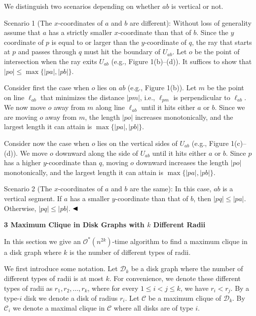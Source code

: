 \documentclass[10pt,a4paper]{amsart}
\begin{document}
We distinguish two scenarios depending on whether $ab$ is vertical or not.
\par
\par
Scenario 1 (The $x$-coordinates of $a$ and $b$ are different): Without loss of generality assume that $a$ has a strictly smaller $x$-coordinate than that of $b$. Since the $y$ coordinate of $p$ is equal to or larger than the $y$-coordinate of $q$, the ray that starts at $p$ and passes through $q$ must hit the boundary of $U_{ab}$. Let $o$ be the point of intersection when the ray exits $U_{ab}$ (e.g., Figure 1(b)–(d)). It suffices to show that $|po|\leq\max\{|pa|,|pb|\}$.
\par
\par
Consider first the case when $o$ lies on $ab$ (e.g., Figure 1(b)). Let $m$ be the point on line $\ell_{ab}$ that minimizes the distance $|pm|$, i.e., $\ell_{pm}$ is perpendicular to $\ell_{ab}$. We now move $o$ away from $m$ along line $\ell_{ab}$ until it hits either $a$ or $b$. Since we are moving $o$ away from $m$, the length $|po|$ increases monotonically, and the largest length it can attain is $\max\{|pa|,|pb|\}$.
\par
\par
Consider now the case when $o$ lies on the vertical sides of $U_{ab}$ (e.g., Figure 1(c)–(d)). We move $o$ downward along the side of $U_{ab}$ until it hits either $a$ or $b$. Since $p$ has a higher $y$-coordinate than $q$, moving $o$ downward increases the length $|po|$ monotonically, and the largest length it can attain is $\max\{|pa|,|pb|\}$.
\par
\par
Scenario 2 (The $x$-coordinates of $a$ and $b$ are the same): In this case, $ab$ is a vertical segment. If $a$ has a smaller $y$-coordinate than that of $b$, then $|pq|\leq|pa|$. Otherwise, $|pq|\leq|pb|$. $\hfill\blacktriangleleft$
\par
\par
\par
\par\medskip\noindent\textbf{3 Maximum Clique in Disk Graphs with $k$ Different Radii}\par
In this section we give an $\mathcal{O}^{*}(n^{2k})$-time algorithm to find a maximum clique in a disk graph where $k$ is the number of different types of radii.
\par
\par
We first introduce some notation. Let $\mathcal{D}_{k}$ be a disk graph where the number of different types of radii is at most $k$. For convenience, we denote these different types of radii as $r_{1},r_{2},\ldots,r_{k}$, where for every $1\leq i<j\leq k$, we have $r_{i}<r_{j}$. By a type-$i$ disk we denote a disk of radius $r_{i}$. Let $\mathcal{C}$ be a maximum clique of $\mathcal{D}_{k}$. By $\mathcal{C}_{i}$ we denote a maximal clique in $\mathcal{C}$ where all disks are of type $i$.
\end{document}
